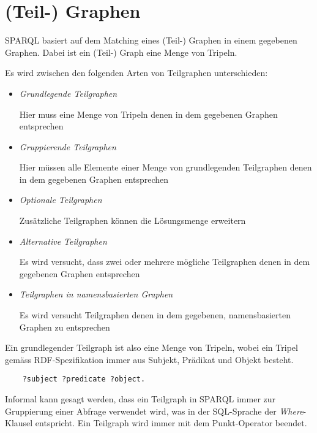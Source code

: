 \section{(Teil-) Graphen}
\label{sec:sparql_graph}

SPARQL basiert auf dem Matching eines (Teil-) Graphen in einem gegebenen Graphen. Dabei ist ein (Teil-) Graph eine Menge von Tripeln.

Es wird zwischen den folgenden Arten von Teilgraphen unterschieden:
\begin{itemize}
\item \textit{Grundlegende Teilgraphen}

Hier muss eine Menge von Tripeln denen in dem gegebenen Graphen entsprechen

\item \textit{Gruppierende Teilgraphen}

Hier müssen alle Elemente einer Menge von grundlegenden Teilgraphen denen in dem gegebenen Graphen entsprechen

\item \textit{Optionale Teilgraphen}

Zusätzliche Teilgraphen können die Lösungsmenge erweitern

\item \textit{Alternative Teilgraphen}

Es wird versucht, dass zwei oder mehrere mögliche Teilgraphen denen in dem gegebenen Graphen entsprechen

\item \textit{Teilgraphen in namensbasierten Graphen}

Es wird versucht Teilgraphen denen in dem gegebenen, namensbasierten Graphen zu entsprechen
\end{itemize}

Ein grundlegender Teilgraph ist also eine Menge von Tripeln, wobei ein Tripel gemäss RDF-Spezifikation immer aus Subjekt, Prädikat und Objekt besteht.~\cite[3.1 Triples]{w3rdf}

\lstset{language=XML}
\begin{lstlisting}
    ?subject ?predicate ?object.
\end{lstlisting}

Informal kann gesagt werden, dass ein Teilgraph in SPARQL immer zur Gruppierung einer Abfrage verwendet wird, was in der SQL-Sprache der \textit{Where}-Klausel entspricht. Ein Teilgraph wird immer mit dem Punkt-Operator beendet.

